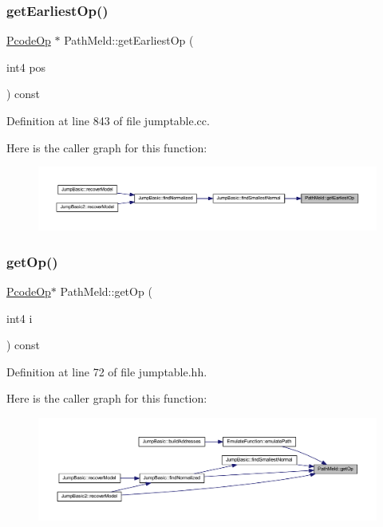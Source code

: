 \subsubsection{\texorpdfstring{getEarliestOp()}{getEarliestOp()}}
{\footnotesize\ttfamily \mbox{\hyperlink{class_pcode_op}{Pcode\+Op}} $\ast$ Path\+Meld\+::get\+Earliest\+Op (\begin{DoxyParamCaption}\item[{int4}]{pos }\end{DoxyParamCaption}) const}



Definition at line 843 of file jumptable.\+cc.

Here is the caller graph for this function\+:
\nopagebreak
\begin{figure}[H]
\begin{center}
\leavevmode
\includegraphics[width=350pt]{class_path_meld_a991b7429bf694ad8c71fe74252ad0cdc_icgraph}
\end{center}
\end{figure}
\mbox{\label{class_path_meld_a2d9b5c63f0ba90e495534fb838e4ed33}} 
\subsubsection{\texorpdfstring{getOp()}{getOp()}}
{\footnotesize\ttfamily \mbox{\hyperlink{class_pcode_op}{Pcode\+Op}}$\ast$ Path\+Meld\+::get\+Op (\begin{DoxyParamCaption}\item[{int4}]{i }\end{DoxyParamCaption}) const\hspace{0.3cm}{\ttfamily [inline]}}



Definition at line 72 of file jumptable.\+hh.

Here is the caller graph for this function\+:
\nopagebreak
\begin{figure}[H]
\begin{center}
\leavevmode
\includegraphics[width=350pt]{class_path_meld_a2d9b5c63f0ba90e495534fb838e4ed33_icgraph}
\end{center}
\end{figure}
\mbox{\label{class_path_meld_a0a31740ea7908d307213753a099b04cb}} 
